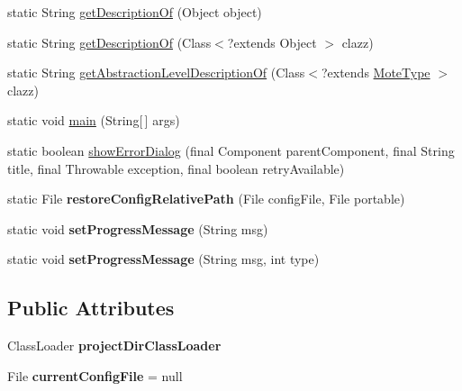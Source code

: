 \begin{DoxyCompactItemize}
\item 
static String \hyperlink{classorg_1_1contikios_1_1cooja_1_1Cooja_af726e520e494a2f604d41193d2226a37}{get\-Description\-Of} (Object object)
\item 
static String \hyperlink{classorg_1_1contikios_1_1cooja_1_1Cooja_a7dbfbb75e29648bb5c0a9e2fa031fb2c}{get\-Description\-Of} (Class$<$?extends Object $>$ clazz)
\item 
static String \hyperlink{classorg_1_1contikios_1_1cooja_1_1Cooja_a87e6969953efa60ca8b6022b8f5fa303}{get\-Abstraction\-Level\-Description\-Of} (Class$<$?extends \hyperlink{interfaceorg_1_1contikios_1_1cooja_1_1MoteType}{Mote\-Type} $>$ clazz)
\item 
static void \hyperlink{classorg_1_1contikios_1_1cooja_1_1Cooja_a92add8a8932d7f4aab5940fe4ea2e387}{main} (String\mbox{[}$\,$\mbox{]} args)
\item 
static boolean \hyperlink{classorg_1_1contikios_1_1cooja_1_1Cooja_a1310bb137c102cc8daab0c313d4d4cee}{show\-Error\-Dialog} (final Component parent\-Component, final String title, final Throwable exception, final boolean retry\-Available)
\item 
\hypertarget{classorg_1_1contikios_1_1cooja_1_1Cooja_a1cfbf6bff9ea12170df5844c76b91a46}{static File {\bfseries restore\-Config\-Relative\-Path} (File config\-File, File portable)}\label{classorg_1_1contikios_1_1cooja_1_1Cooja_a1cfbf6bff9ea12170df5844c76b91a46}

\item 
\hypertarget{classorg_1_1contikios_1_1cooja_1_1Cooja_ae9960e57b2fc41870b90bf0ce141b770}{static void {\bfseries set\-Progress\-Message} (String msg)}\label{classorg_1_1contikios_1_1cooja_1_1Cooja_ae9960e57b2fc41870b90bf0ce141b770}

\item 
\hypertarget{classorg_1_1contikios_1_1cooja_1_1Cooja_acfb0128bba79cd55e99f76225e5d904b}{static void {\bfseries set\-Progress\-Message} (String msg, int type)}\label{classorg_1_1contikios_1_1cooja_1_1Cooja_acfb0128bba79cd55e99f76225e5d904b}

\end{DoxyCompactItemize}
\subsection*{Public Attributes}
\begin{DoxyCompactItemize}
\item 
\hypertarget{classorg_1_1contikios_1_1cooja_1_1Cooja_ae89632f463a9dab28324f33f407b4c28}{Class\-Loader {\bfseries project\-Dir\-Class\-Loader}}\label{classorg_1_1contikios_1_1cooja_1_1Cooja_ae89632f463a9dab28324f33f407b4c28}

\item 
\hypertarget{classorg_1_1contikios_1_1cooja_1_1Cooja_ae65cb892ceb2b39864c0359fba8267af}{File {\bfseries current\-Config\-File} = null}\label{classorg_1_1contikios_1_1cooja_1_1Cooja_ae65cb892ceb2b39864c0359fba8267af}

\end{DoxyCompactItemize}
